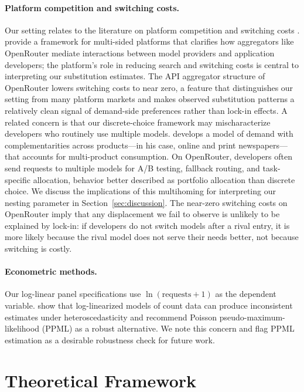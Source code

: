 \documentclass[11pt, a4paper]{article}
\begin{document}
\paragraph{Platform competition and switching costs.} Our setting relates to the literature on platform competition \citep{rietveld2021platform} and switching costs \citep{farrell2007coordination}. \citet{hagiu2015multi} provide a framework for multi-sided platforms that clarifies how aggregators like OpenRouter mediate interactions between model providers and application developers; the platform's role in reducing search and switching costs is central to interpreting our substitution estimates. The API aggregator structure of OpenRouter lowers switching costs to near zero, a feature that distinguishes our setting from many platform markets and makes observed substitution patterns a relatively clean signal of demand-side preferences rather than lock-in effects. A related concern is that our discrete-choice framework may mischaracterize developers who routinely use multiple models. \citet{gentzkow2007valuing} develops a model of demand with complementarities across products---in his case, online and print newspapers---that accounts for multi-product consumption. On OpenRouter, developers often send requests to multiple models for A/B testing, fallback routing, and task-specific allocation, behavior better described as portfolio allocation than discrete choice. We discuss the implications of this multihoming for interpreting our nesting parameter in Section~\ref{sec:discussion}. The near-zero switching costs on OpenRouter imply that any displacement we fail to observe is unlikely to be explained by lock-in: if developers do not switch models after a rival entry, it is more likely because the rival model does not serve their needs better, not because switching is costly.

\paragraph{Econometric methods.} Our log-linear panel specifications use $\ln(\text{requests} + 1)$ as the dependent variable. \citet{santossilva2006log} show that log-linearized models of count data can produce inconsistent estimates under heteroscedasticity and recommend Poisson pseudo-maximum-likelihood (PPML) as a robust alternative. We note this concern and flag PPML estimation as a desirable robustness check for future work.

\section{Theoretical Framework}
\label{sec:theory}
\end{document}
